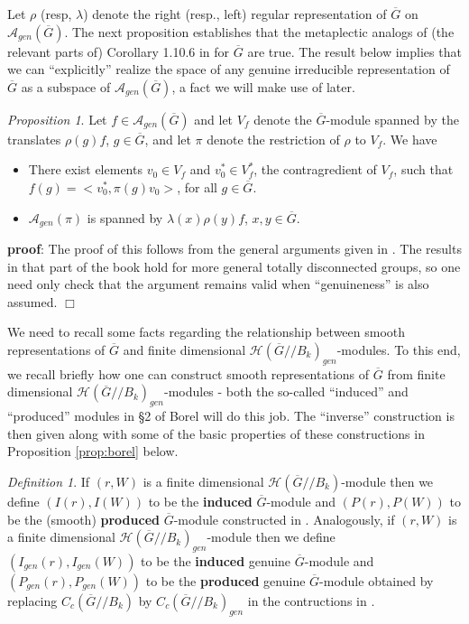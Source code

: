 \documentclass[12pt,letterpaper]{amsart}
\theoremstyle{definition}
\theoremstyle{remark}
\newtheorem{proposition}[theorem]{Proposition}
\newtheorem{definition}[theorem]{Definition}
\begin{document}
Let $\rho$ (resp, $\lambda$) denote the right 
(resp., left) regular representation of $\overline{G}$ 
on $\mathcal{A}_{gen}(\overline{G})$.
The next proposition establishes that the metaplectic 
analogs of (the relevant parts of) Corollary 1.10.6 in
\cite{Sil} for $\overline{G}$ are true. The result below
implies that we can ``explicitly'' realize the space of any genuine
irreducible representation of $\overline{G}$ as a subspace
of $\mathcal{A}_{gen}(\overline{G})$, a fact we will make use of
later.

\begin{proposition} 
\label{prop:silberger}
Let $f\in \mathcal{A}_{gen}(\overline{G})$
and let $V_f$ denote the $\overline{G}$-module
spanned by the translates $\rho(g)f$,
$g\in \overline{G}$, and let $\pi$ denote
the restriction of $\rho$ to $V_f$. We have
\begin{itemize}
\item[(a)]
There exist elements $v_0\in V_f$ and $v_0^*\in V_f^*$,
the contragredient of $V_f$, such that
$f(g)=<v_0^*,\pi(g)v_0>$, for
all $g\in \overline{G}$.
\item[(b)]
$\mathcal{A}_{gen}(\pi)$ is spanned by 
$\lambda(x)\rho(y)f$, $x,y\in \overline{G}$.
\end{itemize}
\end{proposition}

{\bf proof}:
The proof of this follows from the general
arguments given in \cite{Sil}. The results in that
part of the book \cite{Sil} hold for more
general totally disconnected groups,
so one need only check that the
argument remains valid when ``genuineness'' 
is also assumed.
$\Box$

We need to recall some facts regarding the relationship between 
smooth representations of $\overline{G}$ and finite dimensional
$\mathcal{H}(\overline{G}//B_k)_{gen}$-modules. To this end,
we recall briefly how one can construct 
smooth representations of $\overline{G}$ from 
finite dimensional $\mathcal{H}(\overline{G}//B_k)_{gen}$-modules -
both the so-called ``induced'' and ``produced'' modules 
in \S 2 of Borel \cite{Bo} will do this job. 
The ``inverse'' construction is then given along with
some of the basic properties of these constructions
in Proposition \ref{prop:borel} below.

\begin{definition}
If $(r,W)$ is a finite dimensional 
$\mathcal{H}(\overline{G}//B_k)$-module then we define 
$(I(r),I(W))$ to be the {\bf induced} $\overline{G}$-module
and $(P(r),P(W))$ to be the (smooth) {\bf produced} $\overline{G}$-module
constructed in \cite{Bo}. Analogously, if $(r,W)$ is a finite dimensional 
$\mathcal{H}(\overline{G}//B_k)_{gen}$-module then we define 
$(I_{gen}(r),I_{gen}(W))$ to be the {\bf induced} genuine 
$\overline{G}$-module and 
$(P_{gen}(r),P_{gen}(W))$ to be the {\bf produced} genuine 
$\overline{G}$-module obtained by replacing 
$C_c(\overline{G}//B_k)$ by $C_c(\overline{G}//B_k)_{gen}$
in the contructions in \cite{Bo}.
\end{definition}
\end{document}

